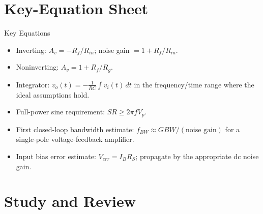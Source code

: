 \documentclass[10pt,letterpaper]{article}
\begin{document}
\section{Key-Equation Sheet}
\begin{CornellExamBox}{Key Equations}
\begin{itemize}
  \item Inverting: $A_v=-R_f/R_{in}$; noise gain $=1+R_f/R_{in}$.
  \item Noninverting: $A_v=1+R_f/R_g$.
  \item Integrator: $v_o(t)=-\frac{1}{RC}\int v_i(t)\,dt$ in the frequency/time range where the ideal assumptions hold.
  \item Full-power sine requirement: $SR\ge2\pi fV_p$.
  \item First closed-loop bandwidth estimate: $f_{BW}\approx GBW/(\text{noise gain})$ for a single-pole voltage-feedback amplifier.
  \item Input bias error estimate: $V_{err}=I_B R_S$; propagate by the appropriate dc noise gain.
\end{itemize}\end{CornellExamBox}
\section{Study and Review}
\end{document}
